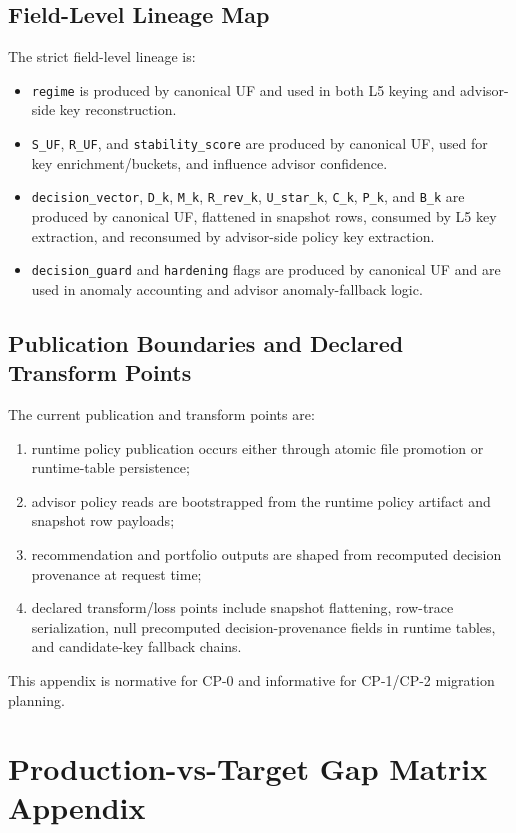 \documentclass[11pt]{report}
\begin{document}
\section{Field-Level Lineage Map}
The strict field-level lineage is:
\begin{itemize}
    \item \texttt{regime} is produced by canonical UF and used in both L5 keying and advisor-side key reconstruction.
    \item \texttt{S\_UF}, \texttt{R\_UF}, and \texttt{stability\_score} are produced by canonical UF, used for key enrichment/buckets, and influence advisor confidence.
    \item \texttt{decision\_vector}, \texttt{D\_k}, \texttt{M\_k}, \texttt{R\_rev\_k}, \texttt{U\_star\_k}, \texttt{C\_k}, \texttt{P\_k}, and \texttt{B\_k} are produced by canonical UF, flattened in snapshot rows, consumed by L5 key extraction, and reconsumed by advisor-side policy key extraction.
    \item \texttt{decision\_guard} and \texttt{hardening} flags are produced by canonical UF and are used in anomaly accounting and advisor anomaly-fallback logic.
\end{itemize}

\section{Publication Boundaries and Declared Transform Points}
The current publication and transform points are:
\begin{enumerate}[leftmargin=1.2cm]
    \item runtime policy publication occurs either through atomic file promotion or runtime-table persistence;
    \item advisor policy reads are bootstrapped from the runtime policy artifact and snapshot row payloads;
    \item recommendation and portfolio outputs are shaped from recomputed decision provenance at request time;
    \item declared transform/loss points include snapshot flattening, row-trace serialization, null precomputed decision-provenance fields in runtime tables, and candidate-key fallback chains.
\end{enumerate}
This appendix is normative for CP-0 and informative for CP-1/CP-2 migration planning.

\chapter{Production-vs-Target Gap Matrix Appendix}
\end{document}
